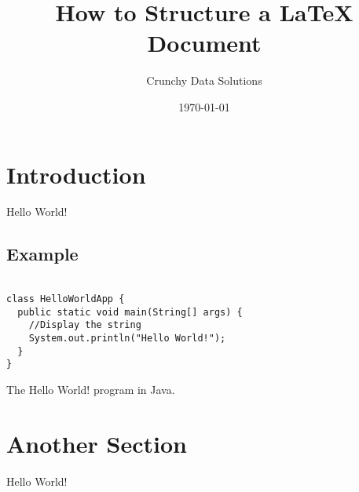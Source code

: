 \documentclass[titlepage]{article}
\begin{document}

\title{How to Structure a \LaTeX{} Document}
\author{Crunchy Data Solutions}
\date{\today}
\maketitle

\tableofcontents
\newpage

\section{Introduction}

Hello World!

\subsection{Example}

\begin{program}
  \begin{verbatim}

class HelloWorldApp {
  public static void main(String[] args) {
    //Display the string
    System.out.println("Hello World!");
  }
}
\end{verbatim}
  \caption{The Hello World! program in Java.}
\end{program}


\section{Another Section}

Hello World!
\end{document}

